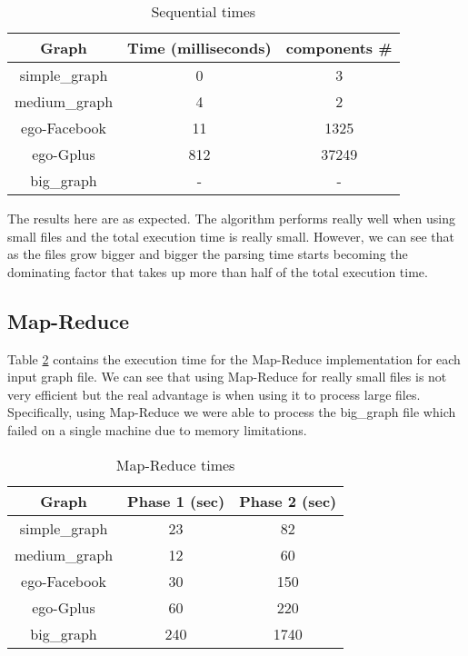 \begin{table}[!h]
\footnotesize
\begin{center}
\begin{tabular}{|c|c|c|}
\hline
{\bf Graph} & {\bf Time (milliseconds)}& {\bf components \#} \\
\hline
\hline
simple\_graph   & 0  & 3  \\
\hline
medium\_graph   & 4  & 2   \\
\hline
ego-Facebook   & 11  & 1325  \\
\hline
ego-Gplus   & 812 & 37249 \\
\hline
big\_graph   & -  & -  \\
\hline
\end{tabular}
\caption{Sequential times}
\label{tb:sequentialtimes}
\end{center}
\end{table}

The results here are as expected. The algorithm performs really well when using small files and the total execution time is really small. However, we can see that as the files grow bigger and bigger the parsing time starts becoming the dominating factor that takes up more than half of the total execution time.

\subsection{Map-Reduce}

Table \ref{tb:MapReducetimes} contains the execution time for the Map-Reduce implementation for each input graph file. We can see that using Map-Reduce for really small files is not very efficient but the real advantage is when using it to process large files. Specifically,  using Map-Reduce we were able to process the big\_graph file which failed on a single machine due to memory limitations.

\begin{table}[h!]
\footnotesize
\begin{center}
\begin{tabular}{|c|c|c|}
\hline
{\bf Graph} & {\bf Phase 1 (sec)} & {\bf Phase 2 (sec)}\\
\hline
\hline
simple\_graph   & 23  & 82 \\
\hline
medium\_graph   & 12 & 60 \\
\hline
ego-Facebook   & 30 & 150 \\
\hline
ego-Gplus   & 60  & 220 \\
\hline
big\_graph   & 240 & 1740 \\
\hline
\end{tabular}
\caption{Map-Reduce times}
\label{tb:MapReducetimes}
\end{center}
\end{table}


